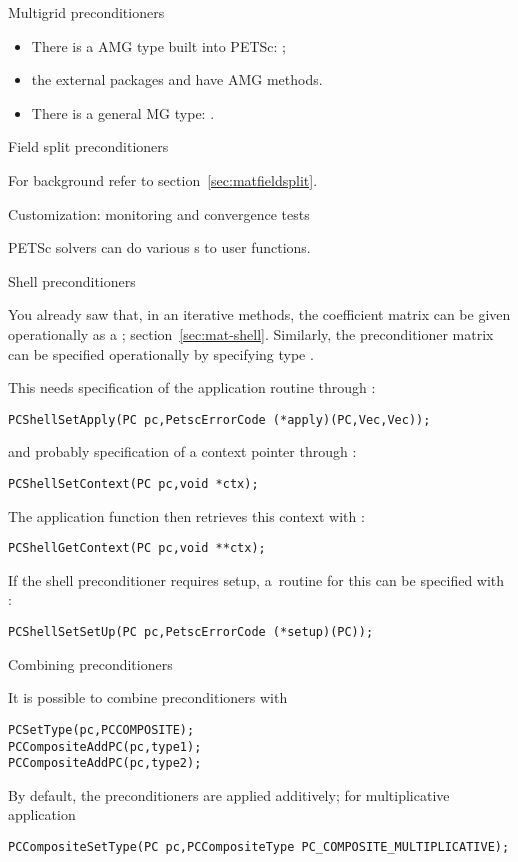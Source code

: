  {Multigrid preconditioners}

\begin{itemize}
\item There is a \ac{AMG} type built into PETSc: ;
\item the external packages  and  have
  \ac{AMG} methods.
\item There is a general \ac{MG} type: .
\end{itemize}

 {Field split preconditioners}
\label{sec:pcfieldsplit}

For background refer to section~\ref{sec:matfieldsplit}.

 {Customization: monitoring and convergence tests}

PETSc solvers can do various s to user functions.

 {Shell preconditioners}

You already saw that,
in an iterative methods, the coefficient matrix can be given operationally
as a ; section~\ref{sec:mat-shell}.
Similarly, the preconditioner matrix can be specified operationally
by specifying type .

This needs specification of the application routine
through :
\begin{lstlisting}
PCShellSetApply(PC pc,PetscErrorCode (*apply)(PC,Vec,Vec));
\end{lstlisting}
and probably specification of a context pointer through
:
\begin{lstlisting}
PCShellSetContext(PC pc,void *ctx);
\end{lstlisting}
The application function then retrieves this context with
:
\begin{lstlisting}
PCShellGetContext(PC pc,void **ctx);
\end{lstlisting}

If the shell preconditioner requires setup, a~routine for this can be specified with
:
\begin{lstlisting}
PCShellSetSetUp(PC pc,PetscErrorCode (*setup)(PC));
\end{lstlisting}

 {Combining preconditioners}

It is possible to combine preconditioners with 
\begin{lstlisting}
PCSetType(pc,PCCOMPOSITE);
PCCompositeAddPC(pc,type1);
PCCompositeAddPC(pc,type2);
\end{lstlisting}
By default, the preconditioners are applied additively;
for multiplicative application
\begin{lstlisting}
PCCompositeSetType(PC pc,PCCompositeType PC_COMPOSITE_MULTIPLICATIVE);
\end{lstlisting}


